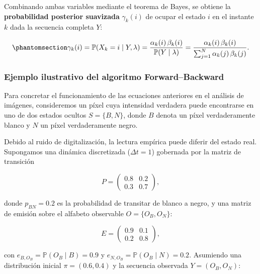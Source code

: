 \documentclass[
  spanish,
  us-letterpaper,
]{scrreprt}
\theoremstyle{definition}
\theoremstyle{remark}
\begin{document}
Combinando ambas variables mediante el teorema de Bayes, se obtiene la
\textbf{probabilidad posterior suavizada} \(\gamma_k(i)\) de ocupar el
estado \(i\) en el instante \(k\) dada la secuencia completa \(Y\):

\begin{equation}\phantomsection\label{eq-gamma-posterior}{
\gamma_k(i) = \mathbb{P}(X_k = i \mid Y, \lambda) = \frac{\alpha_k(i)\,\beta_k(i)}{\mathbb{P}(Y \mid \lambda)} = \frac{\alpha_k(i)\,\beta_k(i)}{\sum_{j=1}^{N} \alpha_k(j)\,\beta_k(j)}.
}\end{equation}

\subsubsection{Ejemplo ilustrativo del algoritmo
Forward--Backward}\label{ejemplo-ilustrativo-del-algoritmo-forwardbackward}

Para concretar el funcionamiento de las ecuaciones anteriores en el
análisis de imágenes, consideremos un píxel cuya intensidad verdadera
puede encontrarse en uno de dos estados ocultos \(S = \{B, N\}\), donde
\(B\) denota un píxel verdaderamente blanco y \(N\) un píxel
verdaderamente negro.

Debido al ruido de digitalización, la lectura empírica puede diferir del
estado real. Supongamos una dinámica discretizada (\(\Delta t = 1\))
gobernada por la matriz de transición

\[
P = \begin{pmatrix} 0.8 & 0.2 \\ 0.3 & 0.7 \end{pmatrix},
\]

donde \(p_{BN} = 0.2\) es la probabilidad de transitar de blanco a
negro, y una matriz de emisión sobre el alfabeto observable
\(O = \{O_B, O_N\}\):

\[
E = \begin{pmatrix} 0.9 & 0.1 \\ 0.2 & 0.8 \end{pmatrix},
\]

con \(e_{B, O_B} = \mathbb{P}(O_B \mid B) = 0.9\) y
\(e_{N, O_B} = \mathbb{P}(O_B \mid N) = 0.2\). Asumiendo una
distribución inicial \(\pi = (0.6, 0.4)\) y la secuencia observada
\(Y = (O_B, O_N)\):
\end{document}
